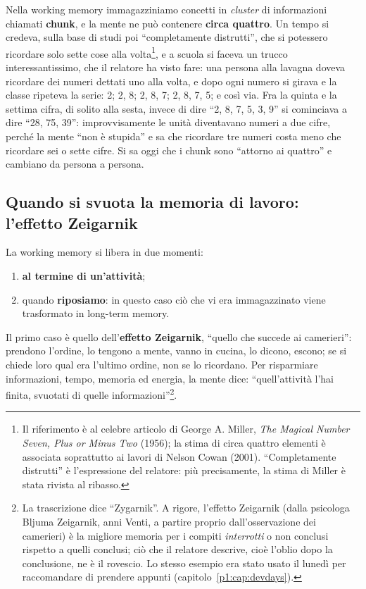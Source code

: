Nella working memory immagazziniamo concetti in \emph{cluster} di
informazioni chiamati \textbf{chunk}, e la mente ne può contenere
\textbf{circa quattro}. Un tempo si credeva, sulla base di studi poi
``completamente distrutti'', che si potessero ricordare solo sette cose alla
volta\footnote{Il riferimento è al celebre articolo di George A. Miller,
\emph{The Magical Number Seven, Plus or Minus Two} (1956); la stima di
circa quattro elementi è associata soprattutto ai lavori di Nelson Cowan
(2001). ``Completamente distrutti'' è l'espressione del relatore: più
precisamente, la stima di Miller è stata rivista al ribasso.}, e a scuola
si faceva un trucco interessantissimo, che il relatore ha visto fare: una
persona alla lavagna doveva ricordare dei numeri dettati uno alla volta, e
dopo ogni numero si girava e la classe ripeteva la serie: 2; 2, 8; 2, 8, 7;
2, 8, 7, 5; e così via. Fra la quinta e la settima cifra, di solito alla
sesta, invece di dire ``2, 8, 7, 5, 3, 9'' si cominciava a dire ``28, 75,
39'': improvvisamente le unità diventavano numeri a due cifre, perché la
mente ``non è stupida'' e sa che ricordare tre numeri costa meno che
ricordare sei o sette cifre. Si sa oggi che i chunk sono ``attorno ai
quattro'' e cambiano da persona a persona.

\subsection{Quando si svuota la memoria di lavoro: l'effetto Zeigarnik}

La working memory si libera in due momenti:
\begin{enumerate}
  \item \textbf{al termine di un'attività};
  \item quando \textbf{riposiamo}: in questo caso ciò che vi era
        immagazzinato viene trasformato in long-term memory.
\end{enumerate}
Il primo caso è quello dell'\textbf{effetto Zeigarnik}, ``quello che
succede ai camerieri'': prendono l'ordine, lo tengono a mente, vanno in
cucina, lo dicono, escono; se si chiede loro qual era l'ultimo ordine, non
se lo ricordano. Per risparmiare informazioni, tempo, memoria ed energia,
la mente dice: ``quell'attività l'hai finita, svuotati di quelle
informazioni''\footnote{La trascrizione dice ``Zygarnik''. A rigore,
l'effetto Zeigarnik (dalla psicologa Bljuma Zeigarnik, anni Venti, a partire
proprio dall'osservazione dei camerieri) è la migliore memoria per i
compiti \emph{interrotti} o non conclusi rispetto a quelli conclusi; ciò che
il relatore descrive, cioè l'oblio dopo la conclusione, ne è il rovescio.
Lo stesso esempio era stato usato il lunedì per raccomandare di prendere
appunti (capitolo~\ref{p1:cap:devdays}).}.

